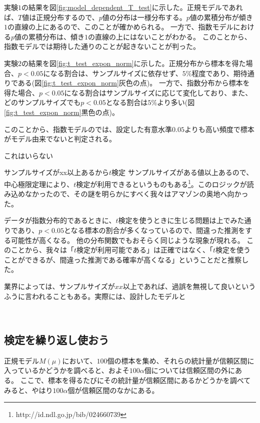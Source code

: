 実験$1$の結果を図\ref{fig:model_dependent_T_test}に示した。正規モデルであれば、$T$値は正規分布するので、$p$値の分布は一様分布する。$p$値の累積分布が傾き$1$の直線の上にあるので、このことが確かめられる。
一方で、指数モデルにおける$p$値の累積分布は、傾き$1$の直線の上にはないことがわかる。
このことから、指数モデルでは期待した通りのことが起きないことが判った。

実験$2$の結果を図\ref{fig:t_test_expon_norm}に示した。正規分布から標本を得た場合、$p<0.05$になる割合は、サンプルサイズに依存せず、$5\%$程度であり、期待通りである(図\ref{fig:t_test_expon_norm}灰色の点)。
一方で、指数分布から標本を得た場合、$p<0.05$になる割合はサンプルサイズに応じて変化しており、また、どのサンプルサイズでも$p<0.05$となる割合は$5\%$より多い(図\ref{fig:t_test_expon_norm}黒色の点)。

このことから、指数モデルのでは、設定した有意水準$0.05$よりも高い頻度で標本がモデル由来でないと判定される。

これはいらない
\begin{SMbox}{サンプルサイズがxx以上あるから$t$検定}
        サンプルサイズがある値以上あるので、中心極限定理により、$t$検定が利用できるというものもある\footnote{http://id.ndl.go.jp/bib/024660739}。このロジックが読み込めなかったので、その謎を明らかにすべく我々はアマゾンの奥地へ向かった。

        データが指数分布的であるときに、$t$検定を使うときに生じる問題は上でみた通りであり、$p<0.05$となる標本の割合が多くなっているので、間違った推測をする可能性が高くなる。
        他の分布関数でもおそらく同じような現象が現れる。
        このことから、我々は「$t$検定が利用可能である」は正確ではなく、「$t$検定を使うことができるが、間違った推測である確率が高くなる」ということだと推察した。

        業界によっては、サンプルサイズが$xx$以上であれば、過誤を無視して良いというふうに言われることもある。実際には、設計したモデルと
\end{SMbox}
\fi
　
\subsection{検定を繰り返し使おう}
正規モデル$M(\mu)$において、$100$個の標本を集め、それらの統計量が信頼区間に入っているかどうかを調べると、およそ$100\alpha$個については信頼区間の外にある。
ここで、標本を得るたびにその統計量が信頼区間にあるかどうかを調べてみると、やはり$100\alpha$個が信頼区間のなかにある。

